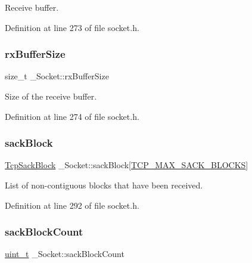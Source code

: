 Receive buffer. 



Definition at line 273 of file socket.\+h.

\mbox{\label{struct__Socket_ab150d0bcff037a5601a105102927dfa3}} 
\subsubsection{\texorpdfstring{rx\+Buffer\+Size}{rxBufferSize}}
{\footnotesize\ttfamily size\+\_\+t \+\_\+\+Socket\+::rx\+Buffer\+Size}



Size of the receive buffer. 



Definition at line 274 of file socket.\+h.

\mbox{\label{struct__Socket_aee81c21cb2628d08f28e4a14563115fd}} 
\subsubsection{\texorpdfstring{sack\+Block}{sackBlock}}
{\footnotesize\ttfamily \hyperlink{structTcpSackBlock}{Tcp\+Sack\+Block} \+\_\+\+Socket\+::sack\+Block\mbox{[}\hyperlink{tcp_8h_a8d978686549f4d2aec3526cadf667dc1}{T\+C\+P\+\_\+\+M\+A\+X\+\_\+\+S\+A\+C\+K\+\_\+\+B\+L\+O\+C\+KS}\mbox{]}}



List of non-\/contiguous blocks that have been received. 



Definition at line 292 of file socket.\+h.

\mbox{\label{struct__Socket_a7a6ff6f130b9262146937812c536e89e}} 
\subsubsection{\texorpdfstring{sack\+Block\+Count}{sackBlockCount}}
{\footnotesize\ttfamily \hyperlink{compiler__port_8h_a12a1e9b3ce141648783a82445d02b58d}{uint\+\_\+t} \+\_\+\+Socket\+::sack\+Block\+Count}



